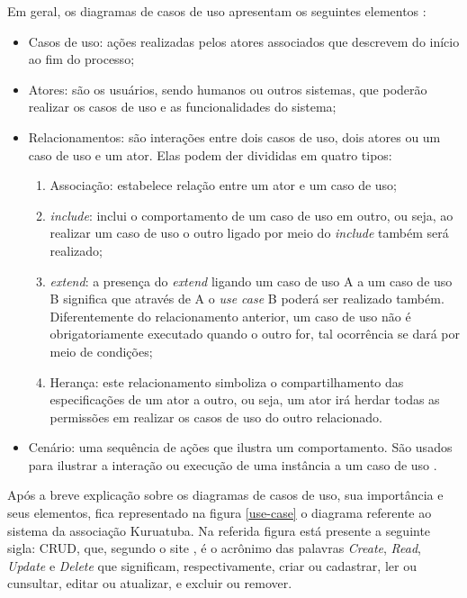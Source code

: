 Em geral, os diagramas de casos de uso apresentam os seguintes elementos :

\begin{itemize}
 \item Casos de uso: ações realizadas pelos atores associados que descrevem do início ao fim do processo;
 \item Atores: são os usuários, sendo humanos ou outros sistemas, que poderão realizar os casos de uso e as funcionalidades do sistema;
 \item Relacionamentos: são interações entre dois casos de uso, dois atores ou um caso de uso e um ator. Elas podem der divididas em quatro tipos:
 
 \begin{enumerate}
  \item Associação: estabelece relação entre um ator e um caso de uso;
  \item \textit{include}: inclui o comportamento de um caso de uso em outro, ou seja, ao realizar um caso de uso o outro ligado por meio do \textit{include} também será realizado;
  \item \textit{extend}: a presença do \textit{extend} ligando um caso de uso A a um caso de uso B significa que através de A o \textit{use case} B poderá ser realizado também. Diferentemente do relacionamento anterior, um caso de uso não é obrigatoriamente executado quando o outro for, tal ocorrência se dará por meio de condições;
  \item Herança: este relacionamento simboliza o compartilhamento das especificações de um ator a outro, ou seja, um ator irá herdar todas as permissões em realizar os casos de uso do outro relacionado.
 \end{enumerate}
 
\item Cenário: uma sequência de ações que ilustra um comportamento. São usados para ilustrar a interação ou execução de uma instância a um caso de uso \cite[~p. 239, tradução nossa]{zapata2007conversion}. 

\end{itemize}

Após a breve explicação sobre os diagramas de casos de uso, sua importância e seus elementos, fica representado na figura \ref{use-case} o diagrama referente ao sistema da associação Kuruatuba. Na referida figura está presente a seguinte sigla: CRUD, que, segundo o site , é o acrônimo das palavras \textit{Create}, \textit{Read}, \textit{Update} e \textit{Delete} que significam, respectivamente, criar ou cadastrar, ler ou cunsultar, editar ou atualizar, e excluir ou remover.

